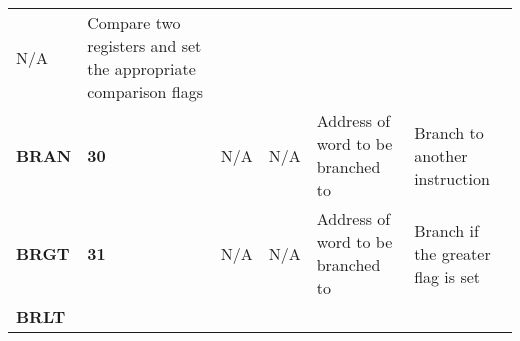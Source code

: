 \documentclass[]{article}
\begin{document}
\begin{longtable}[c]{@{}llllll@{}}
\begin{minipage}[t]{0.14\columnwidth}
N/A
\strut\end{minipage} &
\begin{minipage}[t]{0.14\columnwidth}\raggedright\strut
Compare two registers and set the appropriate comparison flags
\strut\end{minipage}\tabularnewline
\begin{minipage}[t]{0.14\columnwidth}\raggedright\strut
\textbf{BRAN}
\strut\end{minipage} &
\begin{minipage}[t]{0.14\columnwidth}\raggedright\strut
\textbf{30}
\strut\end{minipage} &
\begin{minipage}[t]{0.14\columnwidth}\raggedright\strut
N/A
\strut\end{minipage} &
\begin{minipage}[t]{0.14\columnwidth}\raggedright\strut
N/A
\strut\end{minipage} &
\begin{minipage}[t]{0.14\columnwidth}\raggedright\strut
Address of word to be branched to
\strut\end{minipage} &
\begin{minipage}[t]{0.14\columnwidth}\raggedright\strut
Branch to another instruction
\strut\end{minipage}\tabularnewline
\begin{minipage}[t]{0.14\columnwidth}\raggedright\strut
\textbf{BRGT}
\strut\end{minipage} &
\begin{minipage}[t]{0.14\columnwidth}\raggedright\strut
\textbf{31}
\strut\end{minipage} &
\begin{minipage}[t]{0.14\columnwidth}\raggedright\strut
N/A
\strut\end{minipage} &
\begin{minipage}[t]{0.14\columnwidth}\raggedright\strut
N/A
\strut\end{minipage} &
\begin{minipage}[t]{0.14\columnwidth}\raggedright\strut
Address of word to be branched to
\strut\end{minipage} &
\begin{minipage}[t]{0.14\columnwidth}\raggedright\strut
Branch if the greater flag is set
\strut\end{minipage}\tabularnewline
\begin{minipage}[t]{0.14\columnwidth}\raggedright\strut
\textbf{BRLT}
\strut\end{minipage} &

\end{longtable}
\end{document}
